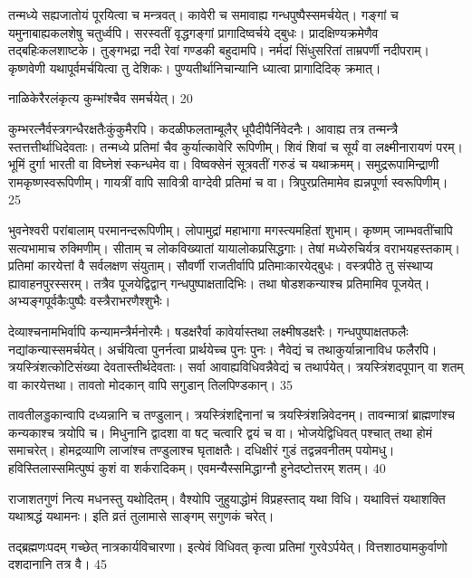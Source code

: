 तन्मध्ये सह्यजातोयं पूरयित्वा च मन्त्रवत्।
कावेरी च समावाह्य गन्धपुष्पैस्समर्चयेत्।
गङ्गां च यमुनाबाह्यकलशेषु चतुर्ध्वपि।
सरस्वतीं वृद्धगङ्गां प्रागादिष्वर्चये द्बुधः।
प्रादक्षिण्यक्रमेणैव तद्बहिःकलशाष्टके।
तुङ्गभद्रा नदी रेवां गण्डकी बहुदामपि।
नर्मदां सिंधुसरितां ताम्रपर्णी नदीपराम्।
कृष्णवेणी यथापूर्वमर्चयित्वा तु देशिकः।
पुण्यतीर्थानिचान्यानि ध्यात्वा प्रागादिदिक् क्रमात्।

नाळिकेरैरलंकृत्य कुम्भांश्चैव समर्चयेत्।
20

कुम्भरत्नैर्वस्त्रगन्धैरक्षतैःकुंकुमैरपि।
कदळीफलताम्बूलैर् धूपैदीपैर्निवेदनैः।
आवाह्य तत्र तन्मन्त्रै स्तत्तत्तीर्थाधिदेवताः।
तन्मध्ये प्रतिमां चैव कुर्यात्कावेरि रूपिणीम्।
शिवं शिवां च सूर्यं वा लक्ष्मीनारायणं परम्।
भूमिं दुर्गा भारती वा विघ्नेशं स्कन्धमेव वा।
विष्वक्सेनं सूत्रवतीं गरुडं च यथाक्रमम्।
समुद्ररूपामिन्द्राणी रामकृष्णस्वरूपिणीम्।
गायत्रीं वापि सावित्री वाग्देवी प्रतिमां च वा।
त्रिपुरप्रतिमामेव ह्यन्नपूर्णा स्वरूपिणीम्।
25

भुवनेश्वरी परांबालाम् परमानन्दरूपिणीम्।
लोपामुद्रां महाभागा मगस्त्यमहितां शुभाम्।
कृष्णम् जाम्भवतींचापि सत्यभामाच रुक्मिणीम्।
सीताम् च लोकविख्यातां यायालोकप्रसिद्धगाः।
तेषां मध्येरुचिर्यत्र वराभयहस्तकाम्।
प्रतिमां कारयेत्तां वै सर्वलक्षण संयुताम्।
सौवर्णी राजतीर्वापि प्रतिमाःकारयेद्बुधः।
वस्त्रपीठे तु संस्थाप्य ह्यावाहनपुरस्सरम्।
तत्रैव पूजयेद्विद्वान् गन्धपुष्पाक्षतादिभिः।
तथा षोडशकन्याश्च प्रतिमामिव पूजयेत्।
अभ्यङ्गपूर्वकैःपुष्पैः वस्त्रैराभरणैश्शुभैः।

देव्याश्चनामभिर्वापि कन्यामन्त्रैर्मनोरमैः।
षडक्षरैर्वा कावेर्यास्तथा लक्ष्मीषडक्षरैः।
गन्धपुष्पाक्षतफलैः नद्यांकन्यास्समर्चयेत्।
अर्चयित्वा पुनर्नत्वा प्रार्थयेच्च पुनः पुनः।
नैवेद्यं च तथाकुर्यान्नानाविध फलैरपि।
त्रयस्त्रिंशत्कोटिसंख्या देवतास्तीर्थदेवताः।
सर्वा आवाह्यविधिवन्नैवेद्यं च तथार्पयेत्।
त्रयस्त्रिंशदपूपान् वा शतम् वा कारयेत्तथा।
तावतो मोदकान् वापि सगुडान् तिलपिण्डकान्।
35

तावतीलड्डकान्वापि दध्यन्नानि च तण्डुलान्।
त्रयस्त्रिंशद्दिनानां च त्रयस्त्रिंशन्निवेदनम्।
तावन्मात्रां ब्राह्मणांश्च कन्यकाश्च त्रयोपि च।
मिधुनानि द्वादशा वा षट् चत्वारि द्वयं च वा।
भोजयेद्विधिवत् पश्चात् तथा होमं समाचरेत्।
होमद्रव्याणि लाजांश्च तण्डुलाश्च घृताक्षतैः।
दधिक्षीरं गुडं तद्वन्नवनीतम् पयोमधु।
हविस्तिलास्समित्पुष्पं कुशं वा शर्करादिकम्।
एवमन्यैस्समिद्धाग्नौ हुनेदष्टोत्तरम् शतम्।
40

राजाशतगुणं नित्य मधनस्तु यथोदितम्।
वैश्योपि जुहुयाद्धोमं विप्रहस्ताद् यथा विधि।
यथावित्तं यथाशक्ति यथाश्रद्धं यथामनः।
इति व्रतं तुलामासे साङ्गम् सगुणकं चरेत्।

तद्ब्रह्मणःपदम् गच्छेत् नात्रकार्यविचारणा।
इत्येवं विधिवत् कृत्वा प्रतिमां गुरवेऽर्पयेत्।
वित्तशाठ्यामकुर्वाणो दशदानानि तत्र वै।
45

